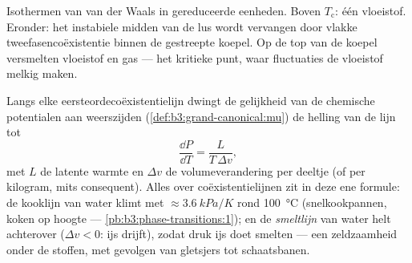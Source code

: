 \begin{omfigure}

{\small Isothermen van van der Waals in gereduceerde eenheden. Boven
$T_{\text{c}}$: één vloeistof. Eronder: het instabiele midden van de
lus wordt vervangen door vlakke tweefasencoëxistentie binnen de
gestreepte koepel. Op de top van de koepel versmelten vloeistof en
gas --- het kritieke punt, waar fluctuaties de vloeistof melkig maken.}
\end{omfigure}

\begin{proposition}\label{prop:b3:phase-transitions:clapeyron}
Langs elke eersteordecoëxistentielijn dwingt de gelijkheid van de
chemische potentialen aan weerszijden
(\cref{def:b3:grand-canonical:mu}) de helling van de lijn tot
\[
\frac{\dd P}{\dd T} = \frac{L}{T\,\Delta v} ,
\]
met $L$ de latente warmte en $\Delta v$ de volumeverandering per
deeltje (of per kilogram, mits consequent). Alles over
coëxistentielijnen zit in deze ene formule: de kooklijn van water
klimt met $\approx\qty{3.6}{kPa/K}$ rond \qty{100}{\celsius}
(snelkookpannen, koken op hoogte ---
\cref{pb:b3:phase-transitions:1}); en de \emph{smeltlijn} van water
helt achterover ($\Delta v < 0$: ijs drijft), zodat druk ijs doet
smelten --- een zeldzaamheid onder de stoffen, met gevolgen van
gletsjers tot schaatsbanen.
\end{proposition}

